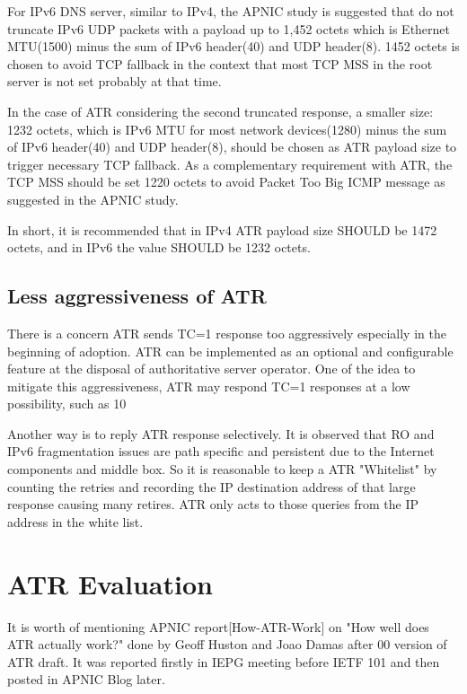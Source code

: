    For IPv6 DNS server, similar to IPv4, the APNIC study is suggested
   that do not truncate IPv6 UDP packets with a payload up to 1,452
   octets which is Ethernet MTU(1500) minus the sum of IPv6 header(40)
   and UDP header(8). 1452 octets is chosen to avoid TCP fallback in the
   context that most TCP MSS in the root server is not set probably at
   that time.

   In the case of ATR considering the second truncated response, a
   smaller size: 1232 octets, which is IPv6 MTU for most network
   devices(1280) minus the sum of IPv6 header(40) and UDP header(8),
   should be chosen as ATR payload size to trigger necessary TCP
   fallback.  As a complementary requirement with ATR, the TCP MSS
   should be set 1220 octets to avoid Packet Too Big ICMP message as
   suggested in the APNIC study.

   In short, it is recommended that in IPv4 ATR payload size SHOULD be
   1472 octets, and in IPv6 the value SHOULD be 1232 octets.

   \subsection{Less aggressiveness of ATR}

   There is a concern ATR sends TC=1 response too aggressively
   especially in the beginning of adoption.  ATR can be implemented as
   an optional and configurable feature at the disposal of authoritative
   server operator.  One of the idea to mitigate this aggressiveness,
   ATR may respond TC=1 responses at a low possibility, such as 10%

   Another way is to reply ATR response selectively.  It is observed
   that RO and IPv6 fragmentation issues are path specific and
   persistent due to the Internet components and middle box.  So it is
   reasonable to keep a ATR "Whitelist" by counting the retries and
   recording the IP destination address of that large response causing
   many retires.  ATR only acts to those queries from the IP address in
   the white list.
 
\section{ATR Evaluation}


   It is worth of mentioning APNIC report[How-ATR-Work] on "How well
   does ATR actually work?" done by Geoff Huston and Joao Damas after 00
   version of ATR draft.  It was reported firstly in IEPG meeting before
   IETF 101 and then posted in APNIC Blog later.

